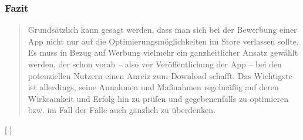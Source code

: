 \documentclass[FIPLY_base.tex]{subfiles}
\begin{document}
\subsubsection{Fazit}
\begin{quote}Grundsätzlich kann gesagt werden, dass man sich bei der Bewerbung einer App nicht nur auf die Optimierungsmöglichkeiten im Store verlassen sollte. Es muss in Bezug auf Werbung vielmehr ein ganzheitlicher Ansatz gewählt werden, der schon vorab – also vor Veröffentlichung der App – bei den potenziellen Nutzern einen Anreiz zum Download schafft. Das Wichtigste ist allerdings, seine Annahmen und Maßnahmen regelmäßig auf deren Wirksamkeit und Erfolg hin zu prüfen und gegebenenfalls zu optimieren bzw. im Fall der Fälle auch gänzlich zu überdenken.\end{quote}
[ \cite{promteil2}]
\end{document}
